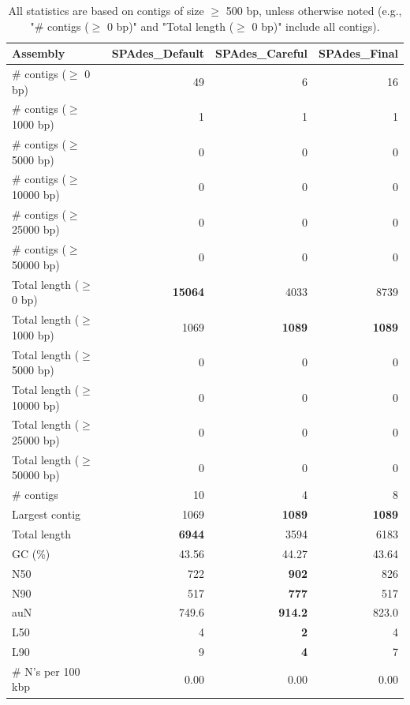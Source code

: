 \documentclass[12pt,a4paper]{article}
\begin{document}
\begin{table}[ht]
\begin{center}
\caption{All statistics are based on contigs of size $\geq$ 500 bp, unless otherwise noted (e.g., "\# contigs ($\geq$ 0 bp)" and "Total length ($\geq$ 0 bp)" include all contigs).}
\begin{tabular}{|l*{3}{|r}|}
\hline
Assembly & SPAdes\_Default & SPAdes\_Careful & SPAdes\_Final \\ \hline
\# contigs ($\geq$ 0 bp) & 49 & 6 & 16 \\ \hline
\# contigs ($\geq$ 1000 bp) & 1 & 1 & 1 \\ \hline
\# contigs ($\geq$ 5000 bp) & 0 & 0 & 0 \\ \hline
\# contigs ($\geq$ 10000 bp) & 0 & 0 & 0 \\ \hline
\# contigs ($\geq$ 25000 bp) & 0 & 0 & 0 \\ \hline
\# contigs ($\geq$ 50000 bp) & 0 & 0 & 0 \\ \hline
Total length ($\geq$ 0 bp) & {\bf 15064} & 4033 & 8739 \\ \hline
Total length ($\geq$ 1000 bp) & 1069 & {\bf 1089} & {\bf 1089} \\ \hline
Total length ($\geq$ 5000 bp) & 0 & 0 & 0 \\ \hline
Total length ($\geq$ 10000 bp) & 0 & 0 & 0 \\ \hline
Total length ($\geq$ 25000 bp) & 0 & 0 & 0 \\ \hline
Total length ($\geq$ 50000 bp) & 0 & 0 & 0 \\ \hline
\# contigs & 10 & 4 & 8 \\ \hline
Largest contig & 1069 & {\bf 1089} & {\bf 1089} \\ \hline
Total length & {\bf 6944} & 3594 & 6183 \\ \hline
GC (\%) & 43.56 & 44.27 & 43.64 \\ \hline
N50 & 722 & {\bf 902} & 826 \\ \hline
N90 & 517 & {\bf 777} & 517 \\ \hline
auN & 749.6 & {\bf 914.2} & 823.0 \\ \hline
L50 & 4 & {\bf 2} & 4 \\ \hline
L90 & 9 & {\bf 4} & 7 \\ \hline
\# N's per 100 kbp & 0.00 & 0.00 & 0.00 \\ \hline
\end{tabular}
\end{center}
\end{table}
\end{document}
